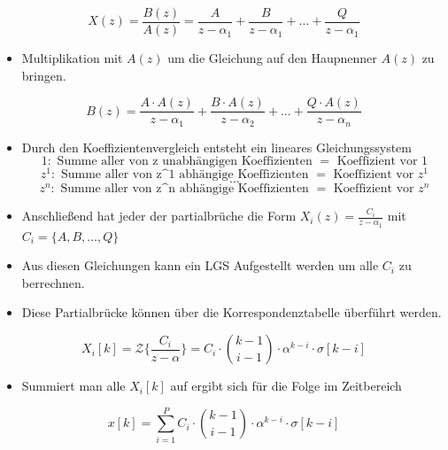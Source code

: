 \documentclass[11pt]{article}
\providecommand{\tightlist}{%
      \setlength{\itemsep}{0pt}\setlength{\parskip}{0pt}}
\begin{document}
\[ X(z) = \frac{B(z)}{A(z)} = \frac{A}{z-\alpha_1} + \frac{B}{z-\alpha_1} + ... + \frac{Q}{z-\alpha_1}\]

    \begin{itemize}
\tightlist
\item
  Multiplikation mit \(A(z)\) um die Gleichung auf den Haupnenner
  \(A(z)\) zu bringen.
\end{itemize}

\[ B(z) = \frac{A\cdot A(z)}{z-\alpha_1} + \frac{B\cdot A(z)}{z-\alpha_2} + ... + \frac{Q\cdot A(z)}{z-\alpha_n}\]

    \begin{itemize}
\tightlist
\item
  Durch den Koeffizientenvergleich entsteht ein lineares
  Gleichungssystem \[
  1   : \textrm{ Summe aller von z unabhängigen Koeffizienten } = \textrm{ Koeffizient vor 1}
  \] \[
  z^1 : \textrm{ Summe aller von z^1 abhängige Koeffizienten }  = \textrm{ Koeffizient vor } z^1
  \] \[
  ...
  \] \[
  z^n : \textrm{ Summe aller von z^n abhängige Koeffizienten }  = \textrm{ Koeffizient vor } z^n
  \]
\end{itemize}

    \begin{itemize}
\tightlist
\item
  Anschließend hat jeder der partialbrüche die Form
  \(X_i(z) = \frac{C_i}{z-\alpha_1}\) mit \(C_i = \{A, B, ..., Q\}\)
\end{itemize}

    \begin{itemize}
\tightlist
\item
  Aus diesen Gleichungen kann ein LGS Aufgestellt werden um alle \(C_i\)
  zu berrechnen.
\end{itemize}

    \begin{itemize}
\tightlist
\item
  Diese Partialbrücke können über die Korrespondenztabelle überführt
  werden.
\end{itemize}

\[X_i[k] = \mathcal{Z}\big\{\frac{C_i}{z-\alpha}\big\} = C_i \cdot \binom{k-1}{i-1} \cdot \alpha^{k-i} \cdot \sigma[k-i]\]

    \begin{itemize}
\tightlist
\item
  Summiert man alle \(X_i[k]\) auf ergibt sich für die Folge im
  Zeitbereich
\end{itemize}

\[x[k] = \sum_{i=1}^P C_i \cdot \binom{k-1}{i-1} \cdot \alpha^{k-i} \cdot \sigma[k-i]\]
\end{document}
